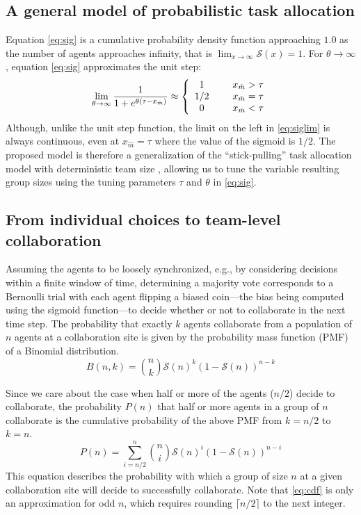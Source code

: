 \documentclass{svmult}  %
\newcommand{\sig}{\mathcal{S}}
\newcommand{\ceil}[1]{\lceil#1\rceil}
\newcommand{\xm}{x_{\hat{m}}}
\begin{document}
\subsection{A general model of probabilistic task allocation}
Equation \eqref{eq:sig} is a cumulative probability density function approaching $1.0$ as the number of agents approaches infinity, that is $\lim_{x \to \infty}\sig(x)=1$. For $\theta \to \infty$, equation \eqref{eq:sig} approximates the unit step:
\begin{equation}
\lim_{\theta \to \infty} \frac{1}{1+e^{\theta(\tau-\xm)}}\approx
\left\{
\begin{array}{cc}
 1 & \hspace{.5cm} \xm>\tau \\
 1/2 & \hspace{.5cm} \xm=\tau \\
 0 & \hspace{.5cm} \xm<\tau
\end{array}
\right.\label{eq:siglim}
\end{equation}
Although, unlike the unit step function, the limit on the left in \eqref{eq:siglim} is always continuous, even at $\xm = \tau$ where the value of the sigmoid is $1/2$. The proposed model is therefore a generalization of the ``stick-pulling'' task allocation model with deterministic team size \cite{Lerman2001}, allowing us to tune the variable resulting group sizes using the tuning parameters $\tau$ and $\theta$ in \eqref{eq:sig}. 

\subsection{From individual choices to team-level collaboration}
Assuming the agents to be loosely synchronized, e.g., by considering decisions within a finite window of time, determining a majority vote corresponds to a Bernoulli trial with each agent flipping a biased coin---the bias being computed using the sigmoid function---to decide whether or not to collaborate in the next time step. The probability that exactly $k$ agents collaborate from a population of $n$ agents at a collaboration site is given by the probability mass function (PMF) of a Binomial distribution.
\begin{equation}
	B(n, k) = \binom{n}{k}\sig(n)^{k}\left(1 - \sig(n)\right)^{n - k}\label{eq:binomial}
\end{equation}

Since we care about the case when half or more of the agents ($n/2$) decide to collaborate, the probability $P(n)$ that half or more agents in a group of $n$ collaborate is the cumulative probability of the above PMF from $k = {n/2}$ to $k = n$. 
\begin{equation}
	P(n) = \sum\limits_{i={n/2}}^{n}\binom{n}{i}\sig(n)^{i}\left(1 - \sig(n)\right)^{n - i}\label{eq:cdf}
\end{equation}
This equation describes the probability with which a group of size $n$ at a given collaboration site will decide to successfully collaborate.  Note that \eqref{eq:cdf} is only an approximation for odd $n$, which requires rounding $\ceil{n/2}$ to the next integer. 
\end{document}
